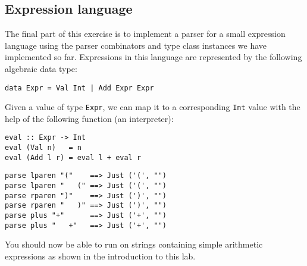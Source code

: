 \taskLine 

\subsection{Expression language}

The final part of this exercise is to implement a parser for a small expression language using the parser combinators and type class instances we have implemented so far. Expressions in this language are represented by the following algebraic data type:
\begin{verbatim}
data Expr = Val Int | Add Expr Expr
\end{verbatim}
Given a value of type \texttt{\small Expr}, we can map it to a corresponding \texttt{\small Int} value with the help of the following function (an interpreter):
\begin{verbatim}
eval :: Expr -> Int 
eval (Val n)   = n
eval (Add l r) = eval l + eval r
\end{verbatim}

\taskLine 

\begin{verbatim}
parse lparen "("    ==> Just ('(', "")
parse lparen "   (" ==> Just ('(', "")
parse rparen ")"    ==> Just (')', "")
parse rparen "   )" ==> Just (')', "")
parse plus "+"      ==> Just ('+', "")
parse plus "   +"   ==> Just ('+', "")
\end{verbatim}


You should now be able to run  on strings containing simple arithmetic expressions as shown in the introduction to this lab.

\taskLine 